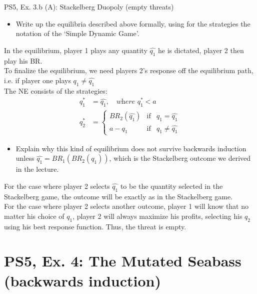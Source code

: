 \begin{frame}{PS5, Ex. 3.b (A): Stackelberg Duopoly (empty threats)}
  \begin{multicols}{2}
    \begin{itemize}
      \item[(a)] Write up the equilibria described above formally, using for the strategies the notation of the ‘Simple Dynamic Game’.
    \end{itemize}
    In the equilibrium, player 1 plays any quantity $\widehat{q_1}$ he is dictated, player 2 then play his BR.\\\medskip
    To finalize the equilibrium, we need players 2's response off the equilibrium path, i.e. if player one plays $q_1\neq\widehat{q_1}$ \\\medskip
    The NE consists of the strategies:
    \begin{align*}
    q_1^*&=\widehat{q_1},\quad\textit{where }q_1^*<a \\
    q_2^*&=\left\{
      \begin{array}{lcl}
          BR_2(\widehat{q_1}) & \text{if} & q_1=\widehat{q_1} \\
          a-q_1 & \text{if} & q_1\neq\widehat{q_1}
      \end{array}\right.
    \end{align*}
    \vfill\null \columnbreak
    \begin{itemize}
      \item[(b)] Explain why this kind of equilibrium does not survive backwards induction unless $\widehat{q_1}=BR_1\left(BR_2(q_1)\right)$, which is the Stackelberg outcome we derived in the lecture.
    \end{itemize}
     For the case where player 2 selects $\widehat{q_1}$ to be the quantity selected in the Stackelberg game, the outcome will be exactly as in the Stackelberg game. \\\medskip
     For the case where player 2 selects another outcome, player 1 will know that no matter his choice of $q_1$, player 2 will always maximize his profits, selecting his $q_2$ using his best response function. Thus, the threat is empty.
    \vfill\null
  \end{multicols}
\end{frame}



\section{PS5, Ex. 4: The Mutated Seabass (backwards induction)}

